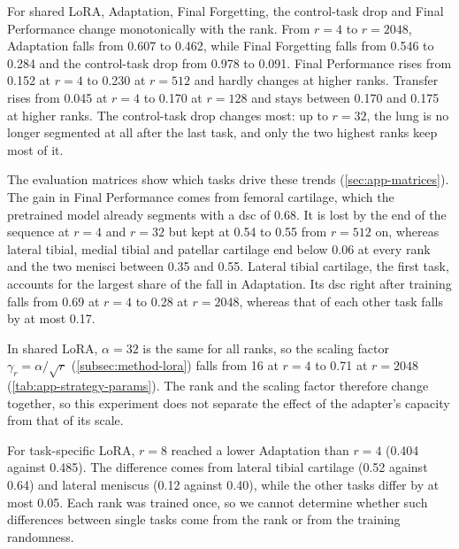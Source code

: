 For shared LoRA, Adaptation, Final Forgetting, the control-task drop and Final Performance change monotonically with the rank.
From $r = 4$ to $r = 2048$, Adaptation falls from 0.607 to 0.462, while Final Forgetting falls from 0.546 to 0.284 and the control-task drop from 0.978 to 0.091.
Final Performance rises from 0.152 at $r = 4$ to 0.230 at $r = 512$ and hardly changes at higher ranks.
Transfer rises from 0.045 at $r = 4$ to 0.170 at $r = 128$ and stays between 0.170 and 0.175 at higher ranks.
The control-task drop changes most: up to $r = 32$, the lung is no longer segmented at all after the last task, and only the two highest ranks keep most of it.

The evaluation matrices show which tasks drive these trends (\cref{sec:app-matrices}).
The gain in Final Performance comes from femoral cartilage, which the pretrained model already segments with a \gls{dsc} of 0.68.
It is lost by the end of the sequence at $r = 4$ and $r = 32$ but kept at 0.54 to 0.55 from $r = 512$ on, whereas lateral tibial, medial tibial and patellar cartilage end below 0.06 at every rank and the two menisci between 0.35 and 0.55.
Lateral tibial cartilage, the first task, accounts for the largest share of the fall in Adaptation.
Its \gls{dsc} right after training falls from 0.69 at $r = 4$ to 0.28 at $r = 2048$, whereas that of each other task falls by at most 0.17.

In shared LoRA, $\alpha = 32$ is the same for all ranks, so the scaling factor $\gamma_r = \alpha / \sqrt{r}$ (\cref{subsec:method-lora}) falls from 16 at $r = 4$ to 0.71 at $r = 2048$ (\cref{tab:app-strategy-params}).
The rank and the scaling factor therefore change together, so this experiment does not separate the effect of the adapter's capacity from that of its scale.

For task-specific LoRA, $r = 8$ reached a lower Adaptation than $r = 4$ (0.404 against 0.485).
The difference comes from lateral tibial cartilage (0.52 against 0.64) and lateral meniscus (0.12 against 0.40), while the other tasks differ by at most 0.05.
Each rank was trained once, so we cannot determine whether such differences between single tasks come from the rank or from the training randomness.

